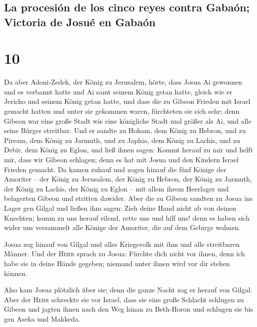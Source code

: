 \hypertarget{la-procesiuxf3n-de-los-cinco-reyes-contra-gabauxf3n-victoria-de-josuuxe9-en-gabauxf3n}{%
\subsection{La procesión de los cinco reyes contra Gabaón; Victoria de
Josué en
Gabaón}\label{la-procesiuxf3n-de-los-cinco-reyes-contra-gabauxf3n-victoria-de-josuuxe9-en-gabauxf3n}}

\hypertarget{section-9}{%
\section{10}\label{section-9}}

 Da aber Adoni-Zedek, der König zu Jerusalem, hörte, dass
Josua Ai gewonnen und es verbannt hatte und Ai samt seinem König getan
hatte, gleich wie er Jericho und seinem König getan hatte, und dass die
zu Gibeon Frieden mit Israel gemacht hatten und unter sie gekommen
waren,  fürchteten sie sich sehr; denn Gibeon war eine
große Stadt wie eine königliche Stadt und größer als Ai, und alle seine
Bürger streitbar.  Und er sandte zu Hoham, dem König zu
Hebron, und zu Piream, dem König zu Jarmuth, und zu Japhia, dem König zu
Lachis, und zu Debir, dem König zu Eglon, und ließ ihnen sagen:
 Kommt herauf zu mir und helft mir, dass wir Gibeon
schlagen; denn es hat mit Josua und den Kindern Israel Frieden gemacht.
 Da kamen zuhauf und zogen hinauf die fünf Könige der
Amoriter -- der König zu Jerusalem, der König zu Hebron, der König zu
Jarmuth, der König zu Lachis, der König zu Eglon -- mit allem ihrem
Heerlager und belagerten Gibeon und stritten dawider. 
Aber die zu Gibeon sandten zu Josua ins Lager gen Gilgal und ließen ihm
sagen: Zieh deine Hand nicht ab von deinen Knechten; komm zu uns herauf
eilend, rette uns und hilf uns! denn es haben sich wider uns versammelt
alle Könige der Amoriter, die auf dem Gebirge wohnen.

 Josua zog hinauf von Gilgal und alles Kriegsvolk mit ihm
und alle streitbaren Männer.  Und der \textsc{Herr} sprach
zu Josua: Fürchte dich nicht vor ihnen, denn ich habe sie in deine Hände
gegeben; niemand unter ihnen wird vor dir stehen können.

 Also kam Josua plötzlich über sie; denn die ganze Nacht
zog er herauf von Gilgal.  Aber der \textsc{Herr}
schreckte sie vor Israel, dass sie eine große Schlacht schlugen zu
Gibeon und jagten ihnen nach den Weg hinan zu Beth-Horon und schlugen
sie bis gen Aseka und Makkeda.

